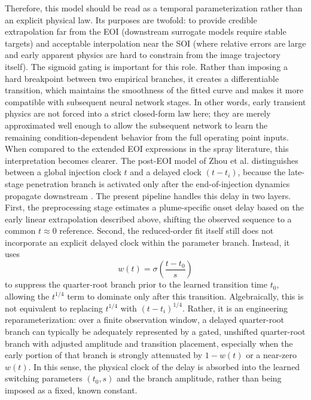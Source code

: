 Therefore, this model should be read as a temporal parameterization rather than an explicit physical law. Its purposes are twofold: to provide credible extrapolation far from the EOI (downstream surrogate models require stable targets) and acceptable interpolation near the SOI (where relative errors are large and early apparent physics are hard to constrain from the image trajectory itself). The sigmoid gating is important for this role. Rather than imposing a hard breakpoint between two empirical branches, it creates a differentiable transition, which maintains the smoothness of the fitted curve and makes it more compatible with subsequent neural network stages. In other words, early transient physics are not forced into a strict closed-form law here; they are merely approximated well enough to allow the subsequent network to learn the remaining condition-dependent behavior from the full operating point inputs.
When compared to the extended EOI expressions in the spray literature, this interpretation becomes clearer. The post-EOI model of Zhou et al. distinguishes between a global injection clock \(t\) and a delayed clock \((t-t_i)\), because the late-stage penetration branch is activated only after the end-of-injection dynamics propagate downstream \cite{ZhouLiLaiWei2019}. The present pipeline handles this delay in two layers. First, the preprocessing stage estimates a plume-specific onset delay based on the early linear extrapolation described above, shifting the observed sequence to a common \(t\approx 0\) reference. Second, the reduced-order fit itself still does not incorporate an explicit delayed clock within the parameter branch. Instead, it uses
\[
w(t)=\sigma\!\left(\frac{t-t_0}{s}\right)
\]
to suppress the quarter-root branch prior to the learned transition time \(t_0\), allowing the \(t^{1/4}\) term to dominate only after this transition. Algebraically, this is not equivalent to replacing \(t^{1/4}\) with \((t-t_i)^{1/4}\). Rather, it is an engineering reparameterization: over a finite observation window, a delayed quarter-root branch can typically be adequately represented by a gated, unshifted quarter-root branch with adjusted amplitude and transition placement, especially when the early portion of that branch is strongly attenuated by \(1-w(t)\) or a near-zero \(w(t)\). In this sense, the physical clock of the delay is absorbed into the learned switching parameters \((t_0,s)\) and the branch amplitude, rather than being imposed as a fixed, known constant.

